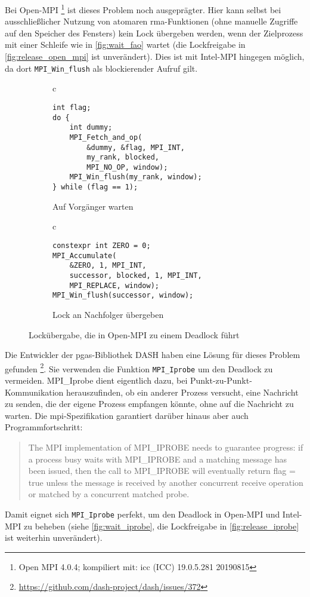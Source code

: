 Bei Open-MPI%
\footnote{Open MPI 4.0.4; kompiliert mit: icc (ICC) 19.0.5.281 20190815}
ist dieses Problem noch ausgeprägter.
Hier kann selbst bei ausschließlicher Nutzung von atomaren \gls{rma}-Funktionen
(ohne manuelle Zugriffe auf den Speicher des \gls{Fenster}s)
kein Lock übergeben werden,
wenn der Zielprozess mit einer Schleife wie in \autoref{fig:wait_fao} wartet
(die Lockfreigabe in \autoref{fig:release_open_mpi} ist unverändert).
Dies ist mit Intel-MPI hingegen möglich,
da dort \texttt{MPI\_Win\_flush} als blockierender Aufruf gilt.

\begin{figure}[h]
    \begin{subfigure}[b]{.5\textwidth}
        \centering
        \begin{tabular}{c}\begin{lstlisting}
int flag;
do {
    int dummy;
    MPI_Fetch_and_op(
        &dummy, &flag, MPI_INT,
        my_rank, blocked,
        MPI_NO_OP, window);
    MPI_Win_flush(my_rank, window);
} while (flag == 1);
        \end{lstlisting}\end{tabular}
        \caption{Auf Vorgänger warten}
        \label{fig:wait_fao}
    \end{subfigure}
    \begin{subfigure}[b]{.5\textwidth}
        \centering
        \begin{tabular}{c}\begin{lstlisting}
constexpr int ZERO = 0;
MPI_Accumulate(
    &ZERO, 1, MPI_INT,
    successor, blocked, 1, MPI_INT,
    MPI_REPLACE, window);
MPI_Win_flush(successor, window);
        \end{lstlisting}\end{tabular}
        \caption{Lock an Nachfolger übergeben}
        \label{fig:release_open_mpi}
    \end{subfigure}
    \caption{Lockübergabe, die in Open-MPI zu einem Deadlock führt}
    \label{fig:deadlock_open_mpi}
\end{figure}

Die Entwickler der \gls{pgas}-Bibliothek DASH haben eine Lösung für dieses Problem gefunden%
\footnote{\url{https://github.com/dash-project/dash/issues/372}}.
Sie verwenden die Funktion \texttt{MPI\_Iprobe} um den Deadlock zu vermeiden.
MPI\_Iprobe dient eigentlich dazu,
bei Punkt-zu-Punkt-Kommunikation herauszufinden,
ob ein anderer Prozess versucht,
eine Nachricht zu senden,
die der eigene Prozess empfangen könnte,
ohne auf die Nachricht zu warten.
Die \gls{mpi}-Spezifikation garantiert darüber hinaus aber auch Programmfortschritt:
\foreignblockcquote{english}[Kapitel 3.8.1, S. 66]{MPI-3.1}{%
    The MPI implementation of \textelp{} MPI\_IPROBE needs to guarantee progress:
    \textelp{} if a process busy waits with MPI\_IPROBE and a
    matching message has been issued, then the call to MPI\_IPROBE will eventually return flag
    = true unless the message is received by another concurrent receive operation or matched
    by a concurrent matched probe.}
Damit eignet sich \texttt{MPI\_Iprobe} perfekt,
um den Deadlock in Open-MPI und Intel-MPI zu beheben
(siehe \autoref{fig:wait_iprobe}, die Lockfreigabe in \autoref{fig:release_iprobe} ist weiterhin unverändert).

